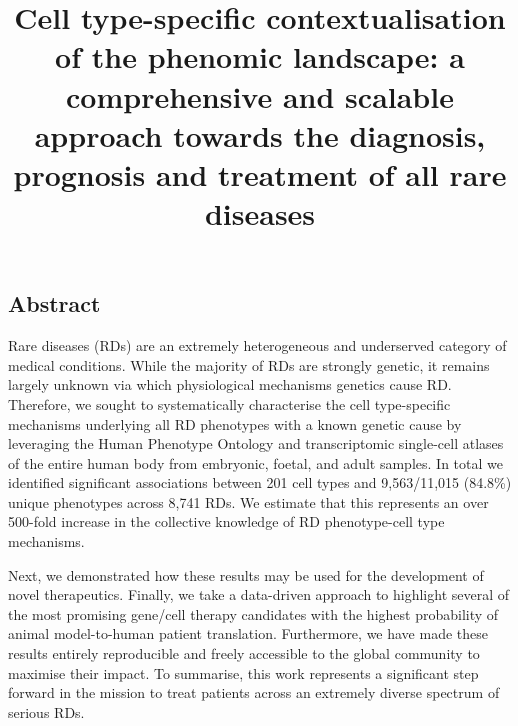 \documentclass[
]{agujournal2019}
\begin{document}
\title{Cell type-specific contextualisation of the phenomic landscape: a
comprehensive and scalable approach towards the diagnosis, prognosis and
treatment of all rare diseases}







\newpage{}

\subsection{Abstract}\label{abstract}

Rare diseases (RDs) are an extremely heterogeneous and underserved
category of medical conditions. While the majority of RDs are strongly
genetic, it remains largely unknown via which physiological mechanisms
genetics cause RD. Therefore, we sought to systematically characterise
the cell type-specific mechanisms underlying all RD phenotypes with a
known genetic cause by leveraging the Human Phenotype Ontology and
transcriptomic single-cell atlases of the entire human body from
embryonic, foetal, and adult samples. In total we identified significant
associations between 201 cell types and 9,563/11,015 (84.8\%) unique
phenotypes across 8,741 RDs. We estimate that this represents an over
500-fold increase in the collective knowledge of RD phenotype-cell type
mechanisms.

Next, we demonstrated how these results may be used for the development
of novel therapeutics. Finally, we take a data-driven approach to
highlight several of the most promising gene/cell therapy candidates
with the highest probability of animal model-to-human patient
translation. Furthermore, we have made these results entirely
reproducible and freely accessible to the global community to maximise
their impact. To summarise, this work represents a significant step
forward in the mission to treat patients across an extremely diverse
spectrum of serious RDs.
\end{document}
